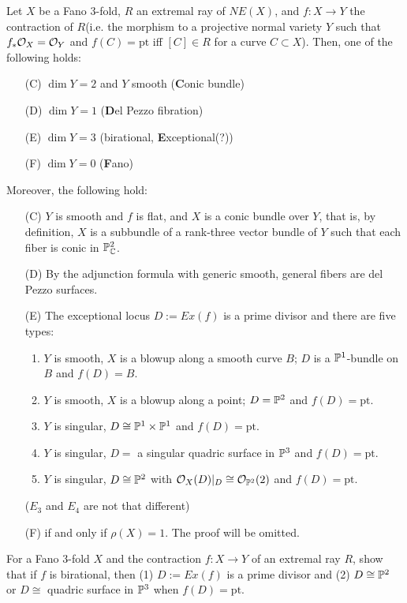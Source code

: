 \documentclass{../../small}
\begin{document}
\begin{thm}[Mori '82]
Let $X$ be a Fano 3-fold, $R$ an extremal ray of $NE(X)$, and $f:X\to Y$ the contraction of $R$(i.e. the morphism to a projective normal variety $Y$ such that $f_*\cO_X=\cO_Y$ and $f(C)=\mathrm{pt}$ iff $[C]\in R$ for a curve $C\subset X$).
Then, one of the following holds:
\begin{enumerate}
\item[(C)] $\dim Y=2$ and $Y$ smooth (\textbf{C}onic bundle)
\item[(D)] $\dim Y=1$ (\textbf{D}el Pezzo fibration)
\item[(E)] $\dim Y=3$ (birational, \textbf{E}xceptional(?))
\item[(F)] $\dim Y=0$ (\textbf{F}ano)
\end{enumerate}
Moreover, the following hold:
\begin{enumerate}
\item[(C)] $Y$ is smooth and $f$ is flat, and $X$ is a conic bundle over $Y$, that is, by definition, $X$ is a subbundle of a rank-three vector bundle of $Y$ such that each fiber is conic in $\P_\C^2$.
\item[(D)] By the adjunction formula with generic smooth, general fibers are del Pezzo surfaces.
\item[(E)] The exceptional locus $D:=Ex(f)$ is a prime divisor and there are five types:
\begin{enumerate}[($E_1$)]
\item $Y$ is smooth, $X$ is a blowup along a smooth curve $B$; $D$ is a $\P^1$-bundle on $B$ and $f(D)=B$.
\item $Y$ is smooth, $X$ is a blowup along a point; $D=\P^2$ and $f(D)=\mathrm{pt}$.
\item $Y$ is singular, $D\cong\P^1\times\P^1$ and $f(D)=\mathrm{pt}$.
\item $Y$ is singular, $D=$ a singular quadric surface in $\P^3$ and $f(D)=\mathrm{pt}$.
\item $Y$ is singular, $D\cong\P^2$ with $\cO_X(D)|_D\cong\cO_{\P^2}(2)$ and $f(D)=\mathrm{pt}$.
\end{enumerate}
($E_3$ and $E_4$ are not that different)
\item[(F)] if and only if $\rho(X)=1$. The proof will be omitted.
\end{enumerate}
\end{thm}

\begin{exe}
For a Fano 3-fold $X$ and the contraction $f:X\to Y$ of an extremal ray $R$, show that if $f$ is birational, then (1) $D:=Ex(f)$ is a prime divisor and (2) $D\cong\P^2$ or $D\cong$ quadric surface in $\P^3$ when $f(D)=\mathrm{pt}$.
\end{exe}
\end{document}
